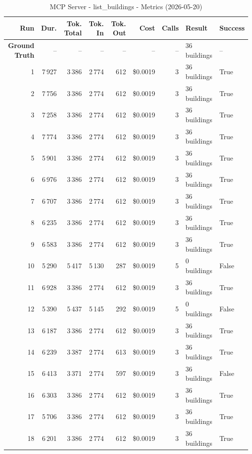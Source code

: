 \documentclass[a4paper,11pt]{article}
\begin{document}
\begin{table}[ht]
\centering
\scriptsize
\caption{MCP Server - list\_buildings - Metrics (2026-05-20)}
\label{tab:mcp\_list\_buildings\_metrics\_2026-05-20}
\begin{tabular}{r r r r r r r p{3cm} l}
\hline
Run & Dur. & Tok. Total & Tok. In & Tok. Out & Cost & Calls & Result & Success \\
\hline
\textbf{Ground Truth} & -- & -- & -- & -- & -- & -- & 36 buildings & -- \\
\hline
1 & 7\,927 & 3\,386 & 2\,774 & 612 & \$0.0019 & 3 & 36 buildings & True \\
2 & 7\,756 & 3\,386 & 2\,774 & 612 & \$0.0019 & 3 & 36 buildings & True \\
3 & 7\,258 & 3\,386 & 2\,774 & 612 & \$0.0019 & 3 & 36 buildings & True \\
4 & 7\,774 & 3\,386 & 2\,774 & 612 & \$0.0019 & 3 & 36 buildings & True \\
5 & 5\,901 & 3\,386 & 2\,774 & 612 & \$0.0019 & 3 & 36 buildings & True \\
6 & 6\,976 & 3\,386 & 2\,774 & 612 & \$0.0019 & 3 & 36 buildings & True \\
7 & 6\,707 & 3\,386 & 2\,774 & 612 & \$0.0019 & 3 & 36 buildings & True \\
8 & 6\,235 & 3\,386 & 2\,774 & 612 & \$0.0019 & 3 & 36 buildings & True \\
9 & 6\,583 & 3\,386 & 2\,774 & 612 & \$0.0019 & 3 & 36 buildings & True \\
10 & 5\,290 & 5\,417 & 5\,130 & 287 & \$0.0019 & 5 & 0 buildings & False \\
11 & 6\,928 & 3\,386 & 2\,774 & 612 & \$0.0019 & 3 & 36 buildings & True \\
12 & 5\,390 & 5\,437 & 5\,145 & 292 & \$0.0019 & 5 & 0 buildings & False \\
13 & 6\,187 & 3\,386 & 2\,774 & 612 & \$0.0019 & 3 & 36 buildings & True \\
14 & 6\,239 & 3\,387 & 2\,774 & 613 & \$0.0019 & 3 & 36 buildings & True \\
15 & 6\,413 & 3\,371 & 2\,774 & 597 & \$0.0019 & 3 & 36 buildings & False \\
16 & 6\,303 & 3\,386 & 2\,774 & 612 & \$0.0019 & 3 & 36 buildings & True \\
17 & 5\,706 & 3\,386 & 2\,774 & 612 & \$0.0019 & 3 & 36 buildings & True \\
18 & 6\,201 & 3\,386 & 2\,774 & 612 & \$0.0019 & 3 & 36 buildings & True \\

\end{tabular}
\end{table}
\end{document}
